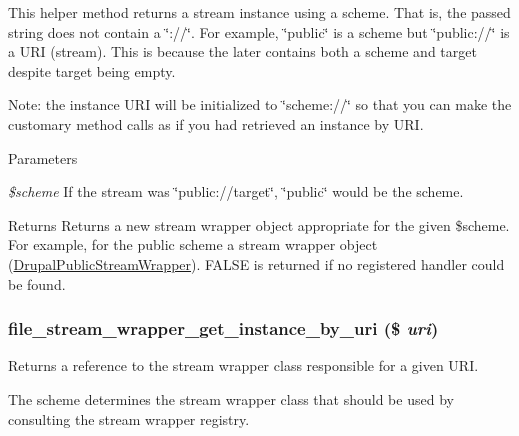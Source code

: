 This helper method returns a stream instance using a scheme. That is, the passed string does not contain a \char`\"{}://\char`\"{}. For example, \char`\"{}public\char`\"{} is a scheme but \char`\"{}public://\char`\"{} is a URI (stream). This is because the later contains both a scheme and target despite target being empty.

Note: the instance URI will be initialized to \char`\"{}scheme://\char`\"{} so that you can make the customary method calls as if you had retrieved an instance by URI.


\begin{DoxyParams}{Parameters}
\item[{\em \$scheme}]If the stream was \char`\"{}public://target\char`\"{}, \char`\"{}public\char`\"{} would be the scheme.\end{DoxyParams}
\begin{DoxyReturn}{Returns}
Returns a new stream wrapper object appropriate for the given \$scheme. For example, for the public scheme a stream wrapper object (\hyperlink{classDrupalPublicStreamWrapper}{DrupalPublicStreamWrapper}). FALSE is returned if no registered handler could be found. 
\end{DoxyReturn}
\hypertarget{group__file_ga2a693e908e5d4764c56f60b94070a635}{
\subsubsection[{file\_\-stream\_\-wrapper\_\-get\_\-instance\_\-by\_\-uri}]{\setlength{\rightskip}{0pt plus 5cm}file\_\-stream\_\-wrapper\_\-get\_\-instance\_\-by\_\-uri (\$ {\em uri})}}
\label{group__file_ga2a693e908e5d4764c56f60b94070a635}
Returns a reference to the stream wrapper class responsible for a given URI.

The scheme determines the stream wrapper class that should be used by consulting the stream wrapper registry.


